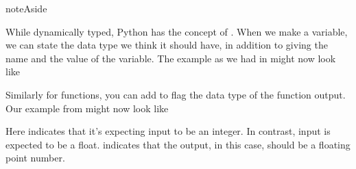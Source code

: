 \documentclass[letterpaper,10pt,british]{sphinxmanual}
\begin{document}
\begin{sphinxadmonition}{note}{Aside}

\sphinxAtStartPar
While dynamically typed, Python has the concept of . When we make a variable, we can state the data type we think it should have, in addition to giving the name and the value of the variable. The example as we had in {\hyperref[\detokenize{chapters/programming_fundamentals/variables:single-variables}]{}} might now look like

\begin{sphinxVerbatim}[commandchars=\\\{\}]
   
   
   
   
   
\end{sphinxVerbatim}

\sphinxAtStartPar
Similarly for functions, you can add  to flag the data type of the function output. Our example from {\hyperref[\detokenize{chapters/programming_fundamentals/functions:functions}]{}} might now look like

\begin{sphinxVerbatim}[commandchars=\\\{\}]
     
           
      
\end{sphinxVerbatim}

\sphinxAtStartPar
Here  indicates that it’s expecting input  to be an integer. In contrast, input  is expected to be a float.
 indicates that the output,  in this case, should be a floating point number.


\end{sphinxadmonition}
\end{document}

